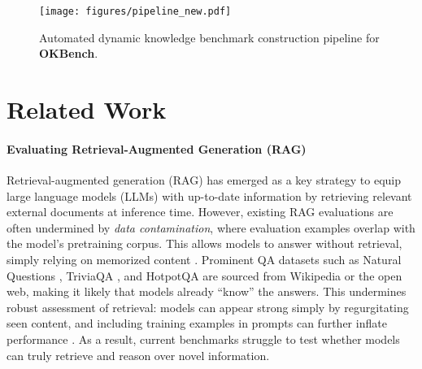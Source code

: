 \documentclass[11pt]{article}
\newcommand{\name}{{\textbf{OKBench}}}
\begin{document}




\begin{figure*}[h]
    \centering
    \texttt{[image: figures/pipeline\_new.pdf]}
    \caption{Automated dynamic knowledge benchmark construction pipeline for \name.}
    \label{fig:pipeline}
\end{figure*}


\section{Related Work}
\label{sec:related-work}

\paragraph{Evaluating Retrieval-Augmented Generation (RAG)}
Retrieval-augmented generation (RAG) has emerged as a key strategy to equip large language models (LLMs) with up-to-date information by retrieving relevant external documents at inference time. However, existing RAG evaluations are often undermined by \emph{data contamination}, where evaluation examples overlap with the model’s pretraining corpus. This allows models to answer without retrieval, simply relying on memorized content \citep{li-etal-2024-open-source}. Prominent QA datasets such as Natural Questions \citep{kwiatkowski-etal-2019-natural}, TriviaQA \citep{joshi-etal-2017-triviaqa}, and HotpotQA \citep{yang-etal-2018-hotpotqa} are sourced from Wikipedia or the open web, making it likely that models already ``know'' the answers. This undermines robust assessment of retrieval: models can appear strong simply by regurgitating seen content, and including training examples in prompts can further inflate performance \citep{wang-etal-2022-training}. As a result, current benchmarks struggle to test whether models can truly retrieve and reason over novel information. 
\end{document}
